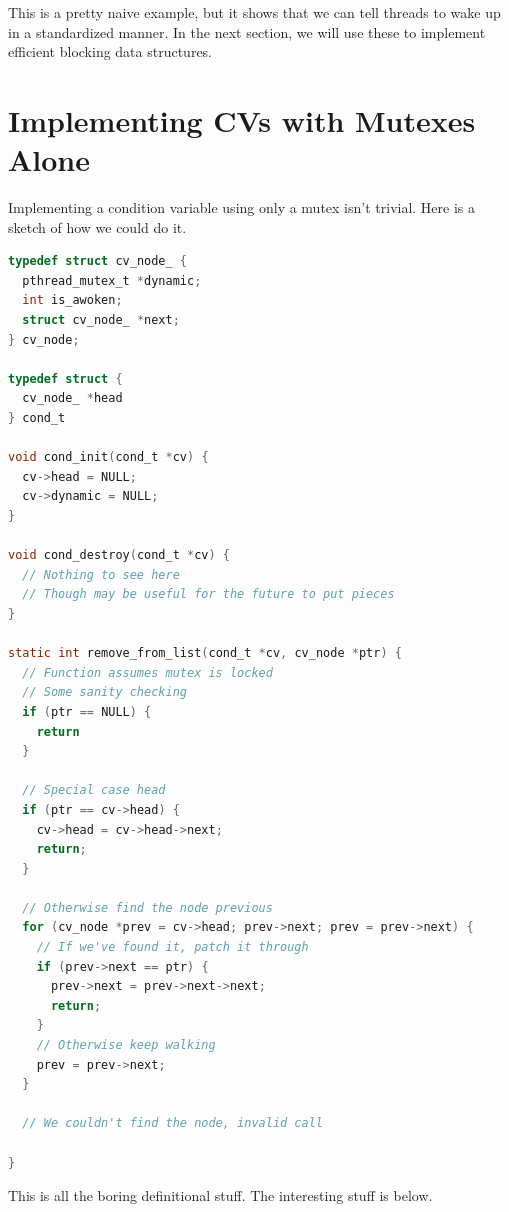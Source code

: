 This is a pretty naive example, but it shows that we can tell threads to wake up in a standardized manner.
In the next section, we will use these to implement efficient blocking data structures.


\section{Implementing CVs with Mutexes Alone}

Implementing a condition variable using only a mutex isn't trivial.
Here is a sketch of how we could do it.

\begin{lstlisting}[language=C]
typedef struct cv_node_ {
  pthread_mutex_t *dynamic;
  int is_awoken;
  struct cv_node_ *next;
} cv_node;

typedef struct {
  cv_node_ *head
} cond_t

void cond_init(cond_t *cv) {
  cv->head = NULL;
  cv->dynamic = NULL;
}

void cond_destroy(cond_t *cv) {
  // Nothing to see here
  // Though may be useful for the future to put pieces
}

static int remove_from_list(cond_t *cv, cv_node *ptr) {
  // Function assumes mutex is locked
  // Some sanity checking
  if (ptr == NULL) {
    return
  }

  // Special case head
  if (ptr == cv->head) {
    cv->head = cv->head->next;
    return;
  }

  // Otherwise find the node previous
  for (cv_node *prev = cv->head; prev->next; prev = prev->next) {
    // If we've found it, patch it through
    if (prev->next == ptr) {
      prev->next = prev->next->next;
      return;
    }
    // Otherwise keep walking
    prev = prev->next;
  }

  // We couldn't find the node, invalid call

}
\end{lstlisting}

This is all the boring definitional stuff.
The interesting stuff is below.

